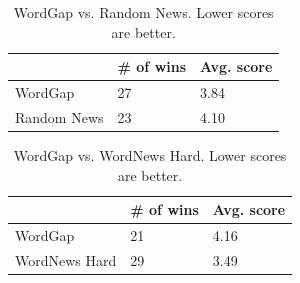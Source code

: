 

\begin{table}[th]
    \caption{WordGap vs. Random News.  Lower scores are better.}
    \label{table:distractor_1}
    \begin{center}
    \begin{tabular}{| p{2.5cm} | p{1.5cm} | p{1.8cm} |}
        \hline
         & {\bf \# of wins} & {\bf Avg. score}\\
        \hline
        WordGap & 27 & 3.84\\
        \hline
        Random News & 23 & 4.10\\
        \hline
    \end{tabular}
    \end{center}
\end{table}

\begin{table}[th]
    \caption{WordGap vs. WordNews Hard.  Lower scores are better.}
    \label{table:distractor_2}
    \begin{center}
    \begin{tabular}{| p{2.5cm} | p{1.5cm} | p{1.8cm} |}
        \hline
         & {\bf \# of wins} & {\bf Avg. score}\\
        \hline
        WordGap & 21 & 4.16\\
        \hline
        WordNews Hard & 29 & 3.49\\
        \hline
    \end{tabular}
    \end{center}
\end{table}


